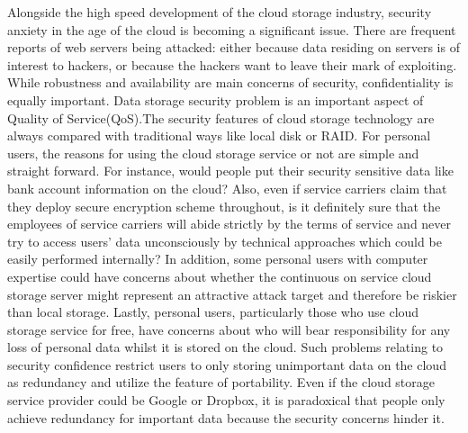 Alongside the high speed development of the cloud storage industry, security anxiety in the age of the cloud is becoming a significant issue. There are frequent reports of web servers being attacked: either because data residing on servers is of interest to hackers, or because the hackers want to leave their mark of exploiting. While robustness and availability are main concerns of security, confidentiality is equally important\cite{Beaver2003}. Data storage security problem is an important aspect of Quality of Service(QoS)\cite{Kumar2010}.The security features of cloud storage technology are always compared with traditional ways like local disk or RAID. For personal users, the reasons for using the cloud storage service or not are simple and straight forward. For instance, would people put their security sensitive data like bank account information on the cloud? Also, even if service carriers claim that they deploy secure encryption scheme throughout, is it definitely sure that the employees of service carriers will abide strictly by the terms of service and never try to access users’ data unconsciously by technical approaches which could be easily performed internally? In addition, some personal users with computer expertise could have concerns about whether the continuous on service cloud storage server might represent an attractive attack target and therefore be riskier than local storage. Lastly, personal users, particularly those who use cloud storage service for free, have concerns about who will bear responsibility for any loss of personal data whilst it is stored on the cloud. Such problems relating to security confidence restrict users to only storing unimportant data on the cloud as redundancy and utilize the feature of portability. Even if the cloud storage service provider could be Google or Dropbox, it is paradoxical that people only achieve redundancy for important data because the security concerns hinder it.

